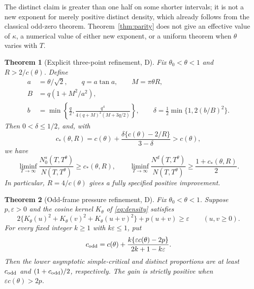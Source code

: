 \documentclass[11pt]{article}
\newtheorem{theorem}{Theorem}[section]
\theoremstyle{remark}
\begin{document}
The distinct claim is greater than one half on some shorter intervals; it
is not a new exponent for merely positive distinct density, which already
follows from the classical odd-zero theorem. Theorem~\ref{thm:parity}
does not give an effective value of $\kappa$, a numerical value of either
new exponent, or a uniform theorem when $\theta$ varies with $T$.

\begin{theorem}[Explicit three-point refinement, D]\label{thm:main}
Fix $\theta_0<\theta<1$ and $R>2/c(\theta)$. Define
\begin{equation}\label{eq:explicit}
\begin{aligned}
 a&=\theta/\sqrt2,\qquad q=a\tan a,\qquad M=\pi\theta R,\\
 B&=q(1+M^2/a^2),\\
 b&=\min\left\{\frac q2,
       \frac{q^4}{4(q+M)^2(M+3q/2)}\right\},\qquad
 \delta=\frac12\min\{1,2(b/B)^2\}.
\end{aligned}
\end{equation}
Then $0<\delta\le1/2$, and, with
\begin{equation}\label{eq:cstar}
 c_*(\theta,R)=c(\theta)
       +\frac{\delta\{c(\theta)-2/R\}}{3-\delta}>c(\theta),
\end{equation}
we have
\begin{equation}\label{eq:mainbounds}
 \liminf_{T\to\infty}\frac{N_0^s(T,T^\theta)}{N(T,T^\theta)}
 \ge c_*(\theta,R),\qquad
 \liminf_{T\to\infty}\frac{N^d(T,T^\theta)}{N(T,T^\theta)}
 \ge\frac{1+c_*(\theta,R)}2.
\end{equation}
In particular, $R=4/c(\theta)$ gives a fully specified positive improvement.
\end{theorem}

\begin{theorem}[Odd-frame pressure refinement, D]\label{thm:pressure}
Fix $\theta_0<\theta<1$. Suppose $p,\varepsilon>0$ and the cosine kernel
$K_\theta$ of \eqref{eq:density} satisfies
\begin{equation}\label{eq:pressure}
 2\{K_\theta(u)^2+K_\theta(v)^2+K_\theta(u+v)^2\}
 +p(u+v)\ge\varepsilon\qquad(u,v\ge0).
\end{equation}
For every fixed integer $k\ge1$ with $k\varepsilon\le1$, put
\begin{equation}\label{eq:pressureconstant}
 c_{\rm odd}=c(\theta)+
 \frac{k\{\varepsilon c(\theta)-2p\}}{2k+1-k\varepsilon}.
\end{equation}
Then the lower asymptotic simple-critical and distinct proportions are at
least $c_{\rm odd}$ and $(1+c_{\rm odd})/2$, respectively. The gain is
strictly positive when $\varepsilon c(\theta)>2p$.
\end{theorem}
\end{document}
